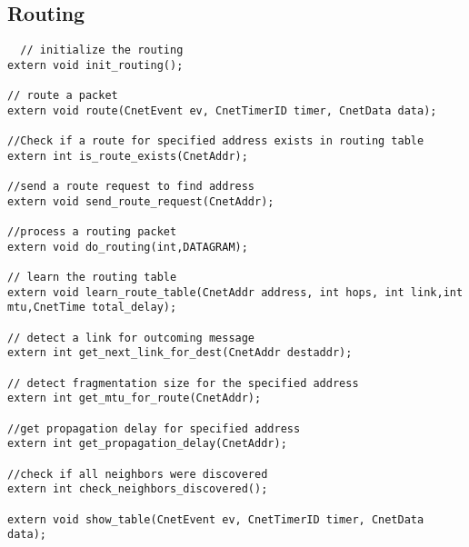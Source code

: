 \documentclass{book}
\begin{document}
\subsection{Routing}

  \begin{lstlisting} 
  // initialize the routing
extern void init_routing();

// route a packet
extern void route(CnetEvent ev, CnetTimerID timer, CnetData data);

//Check if a route for specified address exists in routing table
extern int is_route_exists(CnetAddr);

//send a route request to find address
extern void send_route_request(CnetAddr);

//process a routing packet
extern void do_routing(int,DATAGRAM);

// learn the routing table
extern void learn_route_table(CnetAddr address, int hops, int link,int mtu,CnetTime total_delay);

// detect a link for outcoming message
extern int get_next_link_for_dest(CnetAddr destaddr);

// detect fragmentation size for the specified address
extern int get_mtu_for_route(CnetAddr);

//get propagation delay for specified address
extern int get_propagation_delay(CnetAddr);

//check if all neighbors were discovered
extern int check_neighbors_discovered();

extern void show_table(CnetEvent ev, CnetTimerID timer, CnetData data);
  \end{lstlisting}
\end{document}
